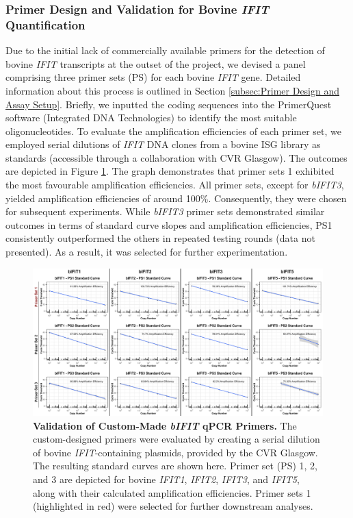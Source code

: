 \subsubsection{Primer Design and Validation for Bovine \textit{IFIT} Quantification} \label{Primer Design and Validation for Bovine IFIT Quantification}
Due to the initial lack of commercially available primers for the detection of bovine \textit{IFIT} transcripts at the outset of the project, we devised a panel comprising three primer sets (PS) for each bovine \textit{IFIT} gene. Detailed information about this process is outlined in Section \ref{subsec:Primer Design and Assay Setup}. Briefly, we inputted the coding sequences into the PrimerQuest software (Integrated DNA Technologies) to identify the most suitable oligonucleotides. To evaluate the amplification efficiencies of each primer set, we employed serial dilutions of \textit{IFIT} DNA clones from a bovine ISG library as standards (accessible through a collaboration with CVR Glasgow). The outcomes are depicted in Figure \ref{fig:Validation of custom-made bIFIT qPCR primers}. The graph demonstrates that primer sets 1 exhibited the most favourable amplification efficiencies. All primer sets, except for \textit{bIFIT3}, yielded amplification efficiencies of around 100\%. Consequently, they were chosen for subsequent experiments. While \textit{bIFIT3} primer sets demonstrated similar outcomes in terms of standard curve slopes and amplification efficiencies, PS1 consistently outperformed the others in repeated testing rounds (data not presented). As a result, it was selected for further experimentation.

\begin{figure}
    \centering
    \includegraphics[width=1\linewidth]{07. Chapter 2/Figs/01. Technologies/02. primer validation.pdf}
    \caption[Validation of Custom-Made \textit{bIFIT} qPCR Primers.]{\textbf{Validation of Custom-Made \textit{bIFIT} qPCR Primers.} The custom-designed primers were evaluated by creating a serial dilution of bovine \textit{IFIT}-containing plasmids, provided by the CVR Glasgow. The resulting standard curves are shown here. Primer set (PS) 1, 2, and 3 are depicted for bovine \textit{IFIT1}, \textit{IFIT2}, \textit{IFIT3}, and \textit{IFIT5}, along with their calculated amplification efficiencies. Primer sets 1 (highlighted in red) were selected for further downstream analyses.}
    \label{fig:Validation of custom-made bIFIT qPCR primers}
\end{figure}

